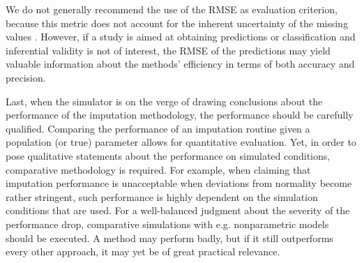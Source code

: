 \documentclass[bimj,fleqn]{w-art}
\begin{document}
We do not generally recommend the use of the RMSE as evaluation criterion, because this metric does not account for the inherent uncertainty of the missing values \citep[][\S 2.5]{buur18}. However, if a study is aimed at obtaining predictions or classification and inferential validity is not of interest, the RMSE of the predictions may yield valuable information about the methods' efficiency in terms of both accuracy and precision.
% 
% 
% 

Last, when the simulator is on the verge of drawing conclusions about the performance of the imputation methodology, the performance should be carefully qualified. Comparing the performance of an imputation routine given a population (or true) parameter allows for quantitative evaluation. Yet, in order to pose qualitative statements about the performance on simulated conditions, comparative methodology is required. For example, when claiming that imputation performance is unacceptable when deviations from normality become rather stringent, such performance is highly dependent on the simulation conditions that are used. For a well-balanced judgment about the severity of the performance drop, comparative simulations with e.g. nonparametric models should be executed. A method may perform badly, but if it still outperforms every other approach, it may yet be of great practical relevance.
\end{document}
